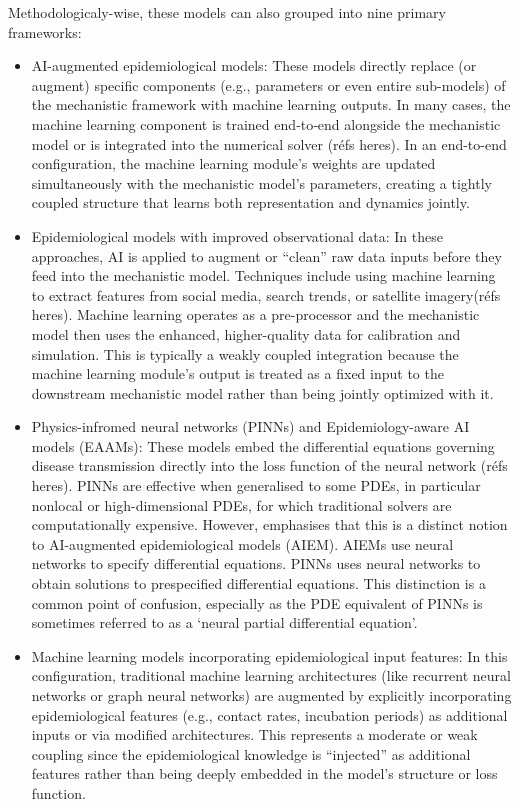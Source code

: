 Methodologicaly-wise, these models can also grouped into nine primary frameworks:
\begin{itemize}
    \item AI-augmented epidemiological models: These models directly replace (or augment) specific components (e.g., parameters or even entire sub-models) of the mechanistic framework with machine learning outputs. In many cases, the machine learning component is trained end‐to‐end alongside the mechanistic model or is integrated into the numerical solver (réfs heres). In an end-to-end configuration, the machine learning module’s weights are updated simultaneously with the mechanistic model’s parameters, creating a tightly coupled structure that learns both representation and dynamics jointly. 
    \item Epidemiological models with improved observational data: In these approaches, AI is applied to augment or “clean” raw data inputs before they feed into the mechanistic model. Techniques include using machine learning to extract features from social media, search trends, or satellite imagery(réfs heres). Machine learning operates as a pre-processor and the mechanistic model then uses the enhanced, higher-quality data for calibration and simulation. This is typically a weakly coupled integration because the machine learning module’s output is treated as a fixed input to the downstream mechanistic model rather than being jointly optimized with it.
    \item Physics-infromed neural networks (PINNs) and Epidemiology-aware AI models (EAAMs): These models embed the differential equations governing disease transmission directly into the loss function of the neural network (réfs heres). PINNs are effective when generalised to some PDEs, in particular nonlocal or high-dimensional PDEs, for which traditional solvers are computationally expensive. However, \cite{Kidger2021}  emphasises that this is a distinct notion to AI-augmented epidemiological models (AIEM). AIEMs use neural networks to specify differential equations. PINNs uses neural networks to obtain solutions to prespecified differential equations. This distinction is a common point of confusion, especially as the PDE equivalent of PINNs is sometimes referred to as a `neural partial differential equation'.
    \item Machine learning models incorporating epidemiological input features: In this configuration, traditional machine learning architectures (like recurrent neural networks or graph neural networks) are augmented by explicitly incorporating epidemiological features (e.g., contact rates, incubation periods) as additional inputs or via modified architectures. This represents a moderate or weak coupling since the epidemiological knowledge is “injected” as additional features rather than being deeply embedded in the model’s structure or loss function.

\end{itemize}
